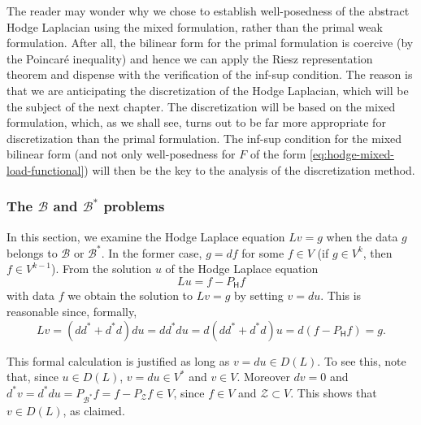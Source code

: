 \begin{Remark}\label{rem:hodge-mixed-discretization-motivation}
{The reader may wonder why we chose to establish well-posedness of the abstract Hodge Laplacian using the mixed formulation, rather than the primal weak formulation. After all, the bilinear form for the primal formulation is coercive (by the Poincaré inequality) and hence we can apply the Riesz representation theorem and dispense with the verification of the inf-sup condition. The reason is that we are anticipating the discretization of the Hodge Laplacian, which will be the subject of the next chapter. The discretization will be based on the mixed formulation, which, as we shall see, turns out to be far more appropriate for discretization than the primal formulation. The inf-sup condition for the mixed bilinear form (and not only well-posedness for $F$ of the form \eqref{eq:hodge-mixed-load-functional}) will then be the key to the analysis of the discretization method.}
\end{Remark}

\subsubsection{{The $\mathcal B$ and $\mathcal B^*$ problems}}\label{subsec:boundary-coboundary-problems}

{In this section, we examine the Hodge Laplace equation $Lv=g$ when the data $g$ belongs to $\mathcal B$ or $\mathcal B^*$. In the former case, $g=df$ for some $f\in V$ (if $g\in V^k$, then $f\in V^{k-1}$). From the solution $u$ of the Hodge Laplace equation}
\begin{equation}\label{eq:hodge-boundary-problem-potential}
Lu=f-P_{\mathsf H}f
\end{equation}
{with data $f$ we obtain the solution to $Lv=g$ by setting $v=du$. This is reasonable since, formally,}
\[
Lv=(dd^*+d^*d)du=dd^*du=d(dd^*+d^*d)u=d(f-P_{\mathsf H}f)=g.
\]

{This formal calculation is justified as long as $v=du\in D(L)$. To see this, note that, since $u\in D(L)$, $v=du\in V^*$ and $v\in V$. Moreover $dv=0$ and $d^*v=d^*du=P_{\mathcal B^*}f=f-P_{\mathcal Z}f\in V$, since $f\in V$ and $\mathcal Z\subset V$. This shows that $v\in D(L)$, as claimed.}

